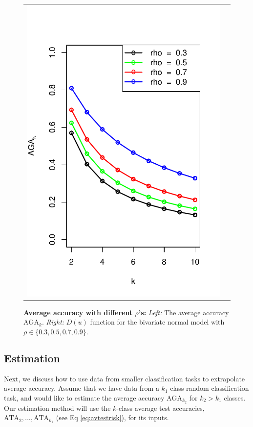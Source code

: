 \documentclass[twoside,11pt]{article}
\begin{document}
\begin{figure}[p]
\begin{tabular}{cc}
\includegraphics[scale = 0.6, clip = true, trim = 0.0in 0 0.2in 0.6in]{illus_rhos_avrisk.pdf}
\end{tabular}

\caption{\textbf{Average accuracy with different $\rho$'s:}
\emph{Left:} The average accuracy $\text{AGA}_k$. \emph{Right:} ${D}(u)$ function for the bivariate normal model with $\rho \in \{0.3, 0.5, 0.7, 0.9\}$.
}\label{fig:toy4}
\end{figure}

\subsection{Estimation}\label{sec:extrapolation_estimation}

Next, we discuss how to use data from smaller classification tasks to
extrapolate average accuracy.  Assume that we have data from a
$k_1$-class random classification task, and would like to estimate the
average accuracy $\text{AGA}_{k_2}$ for $k_2>k_1$ classes.  
Our estimation method will use the $k$-class average test accuracies,
$\text{ATA}_2,...,\text{ATA}_{k_1}$ (see Eq \ref{eq:avtestrisk}), for
its inputs.
\end{document}
